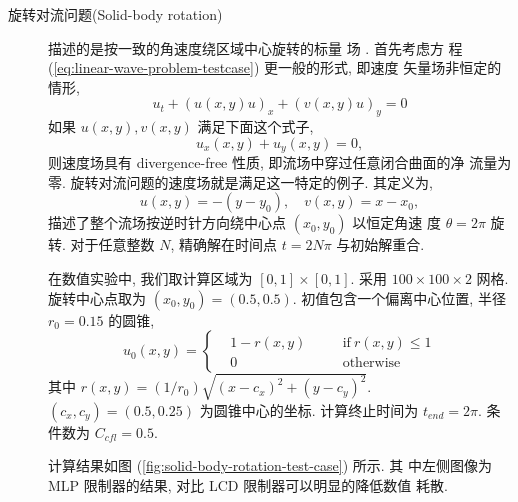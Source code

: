 \begin{description}
\item[旋转对流问题(Solid-body rotation)] 描述的是按一致的角速度绕区域中心旋转的标量
  场 \cite{Leveque2004}. 首先考虑方
  程 (\ref{eq:linear-wave-problem-testcase}) 更一般的形式, 即速度
  矢量场非恒定的情形,
  \begin{equation}
    \label{eq:general-conservative-advection-equation}
    u_{t} + (u(x,y) u)_{x} + (v(x,y) u)_{y} = 0
  \end{equation}
  如果 $u(x,y), v(x,y)$ 满足下面这个式子,
  \begin{equation}
    \label{eq:divergence-free}
    u_{x}(x,y) + u_{y}(x,y) = 0,
  \end{equation}
  则速度场具有 divergence-free 性质, 即流场中穿过任意闭合曲面的净
  流量为零. 旋转对流问题的速度场就是满足这一特定的例子. 其定义为,
  \begin{equation}
    \label{eq:solid-body-rotation-velocity-field}
    u(x,y) = - (y - y_{0}), \quad v(x,y) = x - x_{0},
  \end{equation}
  描述了整个流场按逆时针方向绕中心点 $(x_{0},y_{0})$ 以恒定角速
  度 $\theta = 2\pi$ 旋转. 对于任意整数 $N$, 精确解在时间点 $t =
  2N\pi$ 与初始解重合.

  在数值实验中, 我们取计算区域为 $[0,1]\times[0,1]$. 采用 $100
  \times 100 \times 2$ 网格. 旋转中心点取为 $(x_{0},y_{0}) =
  (0.5,0.5)$. 初值包含一个偏离中心位置, 半径 $r_{0} = 0.15$ 的圆锥,
  \begin{equation}
    \label{eq:initial-condition-solid-body-rotation}
    u_{0}(x,y) =  \left\{
      \begin{aligned}
        & 1 - r(x,y) &\quad & \mbox{if}~ r(x,y) \le 1\\
        &0 &\quad & \mbox{otherwise}
      \end{aligned}
    \right.
  \end{equation}
  其中 $r(x,y) = \left( 1/r_{0} \right) \sqrt{(x-c_{x})^{2} + (y-
   c_{y})^{2}}$. $(c_{x},c_{y}) = (0.5,0.25)$ 为圆锥中心的坐标.
 计算终止时间为 $t_{end} = 2 \pi$. 条件数为 $C_{cfl} = 0.5$.

 计算结果如图 (\ref{fig:solid-body-rotation-test-case}) 所示. 其
 中左侧图像为 MLP 限制器的结果, 对比 LCD 限制器可以明显的降低数值
 耗散.

\end{description}

